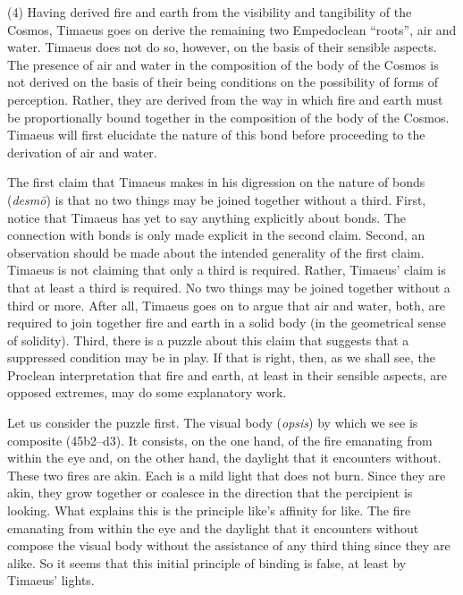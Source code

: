 (4) Having derived fire and earth from the visibility and tangibility of the Cosmos, Timaeus goes on derive the remaining two Empedoclean ``roots'', air and water. Timae\-us does not do so, however, on the basis of their sensible aspects. The presence of air and water in the composition of the body of the Cosmos is not derived on the basis of their being conditions on the possibility of forms of perception. Rather, they are derived from the way in which fire and earth must be proportionally bound together in the composition of the body of the Cosmos. Timaeus will first elucidate the nature of this bond before proceeding to the derivation of air and water.

The first claim that Timaeus makes in his digression on the nature of bonds (\emph{desmō}) is that no two things may be joined together without a third. First, notice that Timaeus has yet to say anything explicitly about bonds. The connection with bonds is only made explicit in the second claim. Second, an observation should be made about the intended generality of the first claim. Timaeus is not claiming that only a third is required. Rather, Timaeus' claim is that at least a third is required. No two things may be joined together without a third or more. After all, Timaeus goes on to argue that air and water, both, are required to join together fire and earth in a solid body (in the geometrical sense of solidity). Third, there is a puzzle about this claim that suggests that a suppressed condition may be in play. If that is right, then, as we shall see, the Proclean interpretation that fire and earth, at least in their sensible aspects, are opposed extremes, may do some explanatory work.

Let us consider the puzzle first. The visual body (\emph{opsis}) by which we see is composite (45b2--d3). It consists, on the one hand, of the fire emanating from within the eye and, on the other hand, the daylight that it encounters without. These two fires are akin. Each is a mild light that does not burn. Since they are akin, they grow together or coalesce in the direction that the percipient is looking. What explains this is the principle like's affinity for like. The fire emanating from within the eye and the daylight that it encounters without compose the visual body without the assistance of any third thing since they are alike. So it seems that this initial principle of binding is false, at least by Timaeus' lights.

